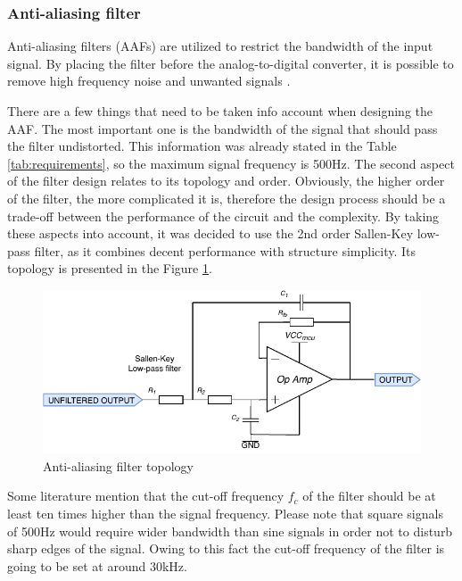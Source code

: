 \documentclass[12pt,a4paper]{article}
\begin{document}
\subsubsection{Anti-aliasing filter}
Anti-aliasing filters (AAFs) are utilized to restrict the bandwidth of the input signal. By placing the filter before the analog-to-digital converter, it is possible to remove high frequency noise and unwanted signals \cite{antialiasing}.\par

There are a few things that need to be taken info account when designing the AAF. The most important one is the bandwidth of the signal that should pass the filter undistorted. This information was already stated in the Table \ref{tab:requirements}, so the maximum signal frequency is 500Hz. The second aspect of the filter design relates to its topology and order. Obviously, the higher order of the filter, the more complicated it is, therefore the design process should be a trade-off between the performance of the circuit and the complexity. By taking these aspects into account, it was decided to use the 2nd order Sallen-Key low-pass filter, as it combines decent performance with structure simplicity. Its topology is presented in the Figure \ref{fig:input4}.
\par

\begin{figure}[ht!]
\includegraphics[scale=1.2]{input4.pdf}
\caption{Anti-aliasing filter topology}
\label{fig:input4}
\end{figure}

Some literature \cite{antialiasing} mention that the cut-off frequency $f_c$ of the filter should be at least ten times higher than the signal frequency. Please note that square signals of 500Hz would require wider bandwidth than sine signals in order not to disturb sharp edges of the signal. Owing to this fact the cut-off frequency of the filter is going to be set at around 30kHz.\par
\end{document}
